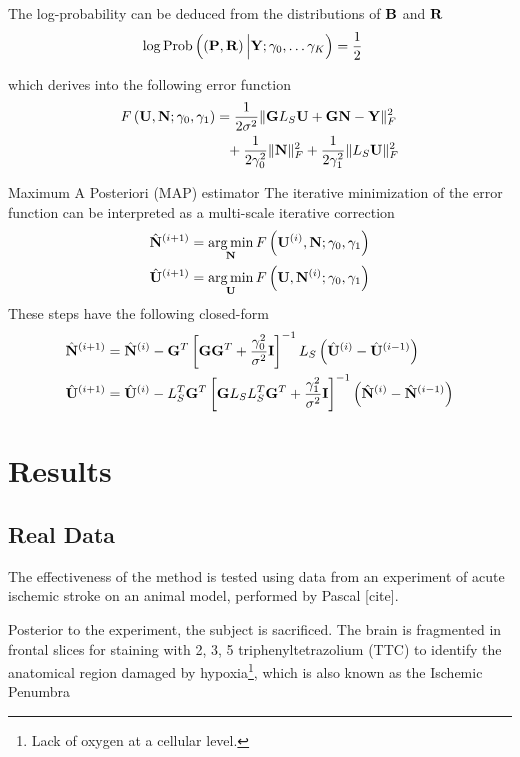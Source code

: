 The log-probability can be deduced from the distributions of ${\mathbf{B}}$ and ${\mathbf{R}}$
\begin{align}
    \log \text{Prob}\left( \left(  {\mathbf{P}}, {\mathbf{R}}  \right) \Big| {\mathbf{Y}; \gamma_0, \dots \gamma_K}  \right)
    &=
    \frac{1}{2}
\end{align}

which derives into the following error function
\begin{align}
    F\left(  {\mathbf{U}}, {\mathbf{N}};  \gamma_0, \gamma_1 \right) &=
    \frac{1}{2\sigma^2}
    \lVert \mathbf{G} L_S \mathbf{U} + \mathbf{G} \mathbf{N} - \mathbf{Y} \rVert_F^2
    \nonumber \\
    &\phantom{=}
    +
    \frac{1}{2\gamma_0^2} \lVert \mathbf{N} \rVert_F^2
    +
    \frac{1}{2\gamma_1^2} \lVert L_S \mathbf{U} \rVert_F^2
\end{align}
 


 {Maximum A Posteriori (MAP) estimator}
    The iterative minimization of the error function can be interpreted as a multi-scale iterative correction
    \begin{align}
        \hat{\mathbf{N}}^{(i+1)} &= \operatorname*{arg\,min}_{\mathbf{N}} F\left( \mathbf{U}^{(i)},\mathbf{N}; \gamma_0, \gamma_1 \right)
        \\
        \hat{\mathbf{U}}^{(i+1)} &= \operatorname*{arg\,min}_{\mathbf{U}} F\left( \mathbf{U},\mathbf{N}^{(i)}; \gamma_0, \gamma_1 \right)
    \end{align}
    These steps have the following closed-form
    \begin{align}
        \hat{\mathbf{N}}^{(i+1)} &=
        \hat{\mathbf{N}}^{(i)}
        -
        \mathbf{G}^T \left[ \mathbf{G} \mathbf{G}^T + \frac{\gamma_0^2}{\sigma^2} \mathbf{I} \right]^{-1} L_S \left( \hat{\mathbf{U}}^{(i)}-\hat{\mathbf{U}}^{(i-1)}  \right)
        \\
        \hat{\mathbf{U}}^{(i+1)} &=
        \hat{\mathbf{U}}^{(i)}
        -
        L_S^T \mathbf{G}^T \left[ \mathbf{G} L_S L_S^T \mathbf{G}^T + \frac{\gamma_1^2}{\sigma^2} \mathbf{I} \right]^{-1} \left( \hat{\mathbf{N}}^{(i)}-\hat{\mathbf{N}}^{(i-1)}  \right)
    \end{align}

\section{Results}

\subsection{Real Data}

The effectiveness of the method is tested using data from an experiment 
of acute ischemic stroke on an animal model, performed by
Pascal [cite].

Posterior to the experiment, the subject is sacrificed.
%
The brain is fragmented in frontal slices for staining with
2, 3, 5 
triphenyltetrazolium (TTC)
to identify the anatomical region damaged by hypoxia\footnote{Lack of oxygen at a cellular level.}, which is also known as the Ischemic Penumbra

